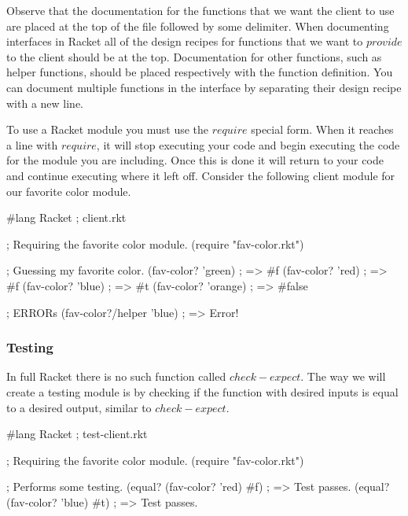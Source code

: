 Observe that the documentation for the functions that we want the client to use are placed at the top of the file followed by some delimiter. When documenting interfaces in Racket all of the design recipes for functions that we want to $provide$ to the client should be at the top. Documentation for other functions, such as helper functions, should be placed respectively with the function definition. You can document multiple functions in the interface by separating their design recipe with a new line.\\


To use a Racket module you must use the $require$ special form. When it reaches a line with $require$, it will stop executing your code and begin executing the code for the module you are including. Once this is done it will return to your code and continue executing where it left off. Consider the following client module for our favorite color module.\\

\begin{code}[Lisp]
#lang Racket ; client.rkt

; Requiring the favorite color module.
(require "fav-color.rkt")

; Guessing my favorite color.
(fav-color? 'green) ; => #f
(fav-color? 'red) ; => #f
(fav-color? 'blue) ; => #t
(fav-color? 'orange) ; => #false

; ERRORs
(fav-color?/helper 'blue) ; => Error!
\end{code}

\subsubsection*{Testing}

In full Racket there is no such function called $check-expect$. The way we will create a testing module is by checking if the function with desired inputs is equal to a desired output, similar to $check-expect$.\\


\begin{code}[Lisp]
#lang Racket ; test-client.rkt

; Requiring the favorite color module.
(require "fav-color.rkt")

; Performs some testing.
(equal? (fav-color? 'red) #f) ; => Test passes.
(equal? (fav-color? 'blue) #t) ; => Test passes.
\end{code}
